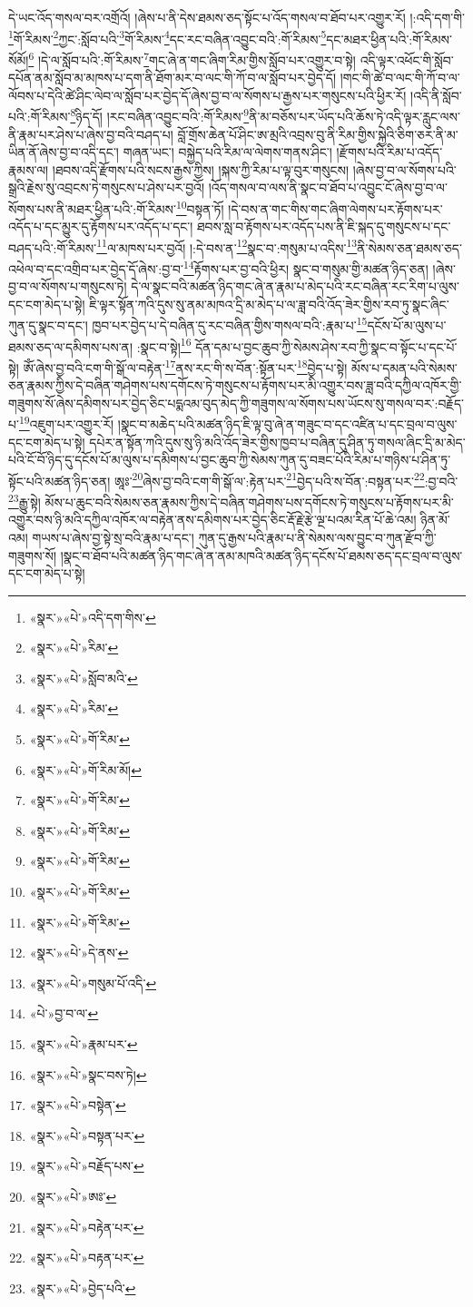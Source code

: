དེ་ཡང་འོད་གསལ་བར་འགྲོའོ། །ཞེས་པ་ནི་དེས་ཐམས་ཅད་སྟོང་པ་འོད་གསལ་བ་ཐོབ་པར་འགྱུར་རོ། །:འདི་དག་གི་\footnote{«སྣར་»«པེ་»འདི་དག་གིས་}གོ་རིམས་\footnote{«སྣར་»«པེ་»རིམ་}ཀྱང་:སློབ་པའི་\footnote{«སྣར་»«པེ་»སློབ་མའི་}གོ་རིམས་\footnote{«སྣར་»«པེ་»རིམ་}དང་རང་བཞིན་འབྱུང་བའི་:གོ་རིམས་\footnote{«སྣར་»«པེ་»གོ་རིམ་}དང་མཐར་ཕྱིན་པའི་:གོ་རིམས་སོམོ།\footnote{«སྣར་»«པེ་»གོ་རིམ་མོ།} །དེ་ལ་སློབ་པའི་:གོ་རིམས་\footnote{«སྣར་»«པེ་»གོ་རིམ་}གང་ཞེ་ན་གང་ཞིག་རིམ་གྱིས་སློབ་པར་འགྱུར་བ་སྟེ། འདི་ལྟར་འཕོང་གི་སློབ་དཔོན་ནམ་སློབ་མ་མཁས་པ་དག་ནི་ཐོག་མར་བ་ལང་གི་ཀོ་བ་ལ་སློབ་པར་བྱེད་དོ། །གང་གི་ཚེ་བ་ལང་གི་ཀོ་བ་ལ་ལོབས་པ་དེའི་ཚེ་ཤིང་ལེབ་ལ་སློབ་པར་བྱེད་དོ་ཞེས་བྱ་བ་ལ་སོགས་པ་རྒྱས་པར་གསུངས་པའི་ཕྱིར་རོ། །འདི་ནི་སློབ་པའི་:གོ་རིམས་\footnote{«སྣར་»«པེ་»གོ་རིམ་}ཉིད་དོ། །རང་བཞིན་འབྱུང་བའི་:གོ་རིམས་\footnote{«སྣར་»«པེ་»གོ་རིམ་}ནི་མ་བཅོས་པར་ཡོད་པའི་ཆོས་ཏེ་འདི་ལྟར་རླུང་ལས་ནི་རྣམ་པར་ཤེས་པ་ཞེས་བྱ་བའི་བཤད་པ། བློ་གྲོས་ཆེན་པོ་ཤིང་ཨ་མྲའི་འབྲས་བུ་ནི་རིམ་གྱིས་སྐྱེའི་ཅིག་ཅར་ནི་མ་ཡིན་ནོ་ཞེས་བྱ་བ་འདི་དང་། གཞན་ཡང་། བསྐྱེད་པའི་རིམ་ལ་ལེགས་གནས་ཤིང་། །རྫོགས་པའི་རིམ་པ་འདོད་རྣམས་ལ། །ཐབས་འདི་རྫོགས་པའི་སངས་རྒྱས་ཀྱིས། །སྐས་ཀྱི་རིམ་པ་ལྟ་བུར་གསུངས། །ཞེས་བྱ་བ་ལ་སོགས་པའི་སྒྲའི་རྗེས་སུ་འབྲངས་ཏེ་གསུངས་པ་ཤེས་པར་བྱའོ། །འོད་གསལ་བ་ལས་ནི་སྣང་བ་ཐོབ་པ་འབྱུང་ངོ་ཞེས་བྱ་བ་ལ་སོགས་པས་ནི་མཐར་ཕྱིན་པའི་:གོ་རིམས་\footnote{«སྣར་»«པེ་»གོ་རིམ་}བསྟན་ཏོ། །དེ་བས་ན་གང་གིས་གང་ཞིག་ལེགས་པར་རྟོགས་པར་འདོད་པ་དང་མྱུར་དུ་རྟོགས་པར་འདོད་པ་དང་། ཐབས་སླ་བ་རྟོགས་པར་འདོད་པས་ནི་ཇི་སྐད་དུ་གསུངས་པ་དང་བཤད་པའི་:གོ་རིམས་\footnote{«སྣར་»«པེ་»གོ་རིམ་}ལ་མཁས་པར་བྱའོ། །:དེ་བས་ན་\footnote{«སྣར་»«པེ་»དེ་ནས་}སྣང་བ་:གསུམ་པ་འདིས་\footnote{«སྣར་»«པེ་»གསུམ་པོ་འདི་}ནི་སེམས་ཅན་ཐམས་ཅད་འཕེལ་བ་དང་འགྲིབ་པར་བྱེད་དོ་ཞེས་:བྱ་བ་\footnote{«པེ་»བྱ་བ་ལ་}རྟོགས་པར་བྱ་བའི་ཕྱིར། སྣང་བ་གསུམ་གྱི་མཚན་ཉིད་ཅན། །ཞེས་བྱ་བ་ལ་སོགས་པ་གསུངས་ཏེ། དེ་ལ་སྣང་བའི་མཚན་ཉིད་གང་ཞེ་ན་རྣམ་པ་མེད་པའི་རང་བཞིན་རང་རིག་པ་ལུས་དང་ངག་མེད་པ་སྟེ། ཇི་ལྟར་སྟོན་ཀའི་དུས་སུ་ནམ་མཁའ་དྲི་མ་མེད་པ་ལ་ཟླ་བའི་འོད་ཟེར་གྱིས་རབ་ཏུ་སྣང་ཞིང་ཀུན་དུ་སྣང་བ་དང་། ཁྱབ་པར་བྱེད་པ་དེ་བཞིན་དུ་རང་བཞིན་གྱིས་གསལ་བའི་:རྣམ་པ་\footnote{«སྣར་»«པེ་»རྣམ་པར་}དངོས་པོ་མ་ལུས་པ་ཐམས་ཅད་ལ་དམིགས་པས་ན། :སྣང་བ་སྟེ།\footnote{«སྣར་»«པེ་»སྣང་བས་ཏེ།} དོན་དམ་པ་བྱང་ཆུབ་ཀྱི་སེམས་ཤེས་རབ་ཀྱི་སྣང་བ་སྟོང་པ་དང་པོ་སྟེ། ཨོཾ་ཞེས་བྱ་བའི་ངག་གི་སྒོ་ལ་བརྟེན་\footnote{«སྣར་»«པེ་»བསྟེན་}ནས་རང་གི་ས་བོན་:སྟོན་པར་\footnote{«སྣར་»«པེ་»བསྟན་པར་}བྱེད་པ་སྟེ། མོས་པ་དམན་པའི་སེམས་ཅན་རྣམས་ཀྱིས་དེ་བཞིན་གཤེགས་པས་དགོངས་ཏེ་གསུངས་པ་རྟོགས་པར་མི་འགྱུར་བས་ཟླ་བའི་དཀྱིལ་འཁོར་གྱི་གཟུགས་སོ་ཞེས་དམིགས་པར་བྱེད་ཅིང་པདྨའམ་བུད་མེད་ཀྱི་གཟུགས་ལ་སོགས་པས་ཡོངས་སུ་གསལ་བར་:བརྗོད་པ་\footnote{«སྣར་»«པེ་»བརྗོད་པས་}འཇུག་པར་འགྱུར་རོ། །སྣང་བ་མཆེད་པའི་མཚན་ཉིད་ཇི་ལྟ་བུ་ཞེ་ན་གཟུང་བ་དང་འཛིན་པ་དང་བྲལ་བ་ལུས་དང་ངག་མེད་པ་སྟེ། དཔེར་ན་སྟོན་ཀའི་དུས་སུ་ཉི་མའི་འོད་ཟེར་གྱིས་ཁྱབ་པ་བཞིན་དུ་ཤིན་ཏུ་གསལ་ཞིང་དྲི་མ་མེད་པའི་ངོ་བོ་ཉིད་དུ་དངོས་པོ་མ་ལུས་པ་དམིགས་པ་བྱང་ཆུབ་ཀྱི་སེམས་ཀུན་དུ་བཟང་པོའི་རིམ་པ་གཉིས་པ་ཤིན་ཏུ་སྟོང་པའི་མཚན་ཉིད་ཅན། ཨཱཿ་\footnote{«སྣར་»«པེ་»ཨཿ་}ཞེས་བྱ་བའི་ངག་གི་སྒོ་ལ་:རྟེན་པར་\footnote{«སྣར་»«པེ་»བརྟེན་པར་}བྱེད་པའི་ས་བོན་:བསྟན་པར་\footnote{«སྣར་»«པེ་»བརྟན་པར་}:བྱ་བའི་\footnote{«སྣར་»«པེ་»བྱེད་པའི་}རྒྱུ་སྟེ། མོས་པ་ཆུང་བའི་སེམས་ཅན་རྣམས་ཀྱིས་དེ་བཞིན་གཤེགས་པས་དགོངས་ཏེ་གསུངས་པ་རྟོགས་པར་མི་འགྱུར་བས་ཉི་མའི་དཀྱིལ་འཁོར་ལ་བརྟེན་ནས་དམིགས་པར་བྱེད་ཅིང་རྡོ་རྗེ་རྩེ་ལྔ་པའམ་རིན་པོ་ཆེ་འམ། ཉིན་མོ་འམ། གཡས་པ་ཞེས་བྱ་སྟེ་སྲ་བའི་རྣམ་པ་དང་། ཀུན་དུ་རྒྱས་པའི་རྣམ་པ་ནི་སེམས་ལས་བྱུང་བ་ཀུན་རྫོབ་ཀྱི་གཟུགས་སོ། །སྣང་བ་ཐོབ་པའི་མཚན་ཉིད་གང་ཞེ་ན་ནམ་མཁའི་མཚན་ཉིད་དངོས་པོ་ཐམས་ཅད་དང་བྲལ་བ་ལུས་དང་ངག་མེད་པ་སྟེ། 